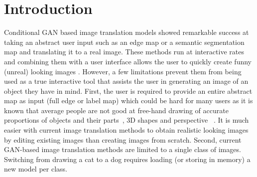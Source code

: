 


\section{Introduction}

Conditional GAN based image translation \cite{isola2016image2image,sangkloy2017scribbler,zhu2017unpaired} models showed remarkable success at taking an abstract user input such as an edge map or a semantic segmentation map and translating it to a real image. These methods run at interactive rates and combining them with a user interface allows the user to quickly create funny (unreal) looking images \cite{edges2cats_demo}. However, a few limitations prevent them from being used as a true interactive tool that assists the user in generating an image of an object they have in mind. First, the user is required to provide an entire abstract map as input (full edge or label map) which could be hard for many users as it is known that average people are not good at free-hand drawing of accurate proportions of objects and their parts~\cite{cohen1997can}, 3D shapes and perspective~\cite{schmidt2009expert} . It is much easier with current image translation methods to obtain realistic looking images by editing existing images \cite{dekel2018sparse,portenier2018faceshop}  than creating images from scratch. Second, current GAN-based image translation methods are limited to a single class of images. Switching from drawing a cat to a dog requires loading (or storing in memory) a new model per class.

